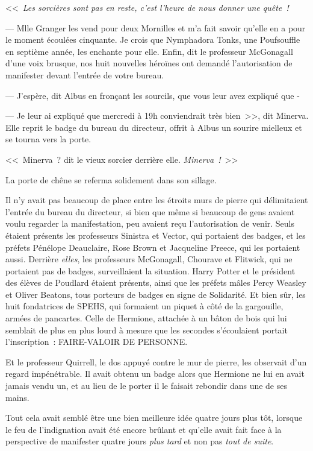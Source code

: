 <<~\emph{Les sorcières sont pas en reste, c'est l'heure de nous donner une quête~!}

--- Mlle Granger les vend pour deux Mornilles et m'a fait savoir qu'elle en a pour le moment écoulées cinquante. Je crois que Nymphadora Tonks, une Poufsouffle en septième année, les enchante pour elle. Enfin, dit le professeur McGonagall d'une voix brusque, nos huit nouvelles héroïnes ont demandé l'autorisation de manifester devant l'entrée de votre bureau.

--- J'espère, dit Albus en fronçant les sourcils, que vous leur avez expliqué que -

--- Je leur ai expliqué que mercredi à 19h conviendrait très bien~>>, dit Minerva. Elle reprit le badge du bureau du directeur, offrit à Albus un sourire mielleux et se tourna vers la porte.

<<~Minerva~? dit le vieux sorcier derrière elle. \emph{Minerva~!}~>>

La porte de chêne se referma solidement dans son sillage.

\later

Il n'y avait pas beaucoup de place entre les étroits murs de pierre qui délimitaient l'entrée du bureau du directeur, si bien que même si beaucoup de gens avaient voulu regarder la manifestation, peu avaient reçu l'autorisation de venir. Seuls étaient présents les professeurs Sinistra et Vector, qui portaient des badges, et les préfets Pénélope Deauclaire, Rose Brown et Jacqueline Preece, qui les portaient aussi. Derrière \emph{elles}, les professeurs McGonagall, Chourave et Flitwick, qui ne portaient pas de badges, surveillaient la situation. Harry Potter et le président des élèves de Poudlard étaient présents, ainsi que les préfets mâles Percy Weasley et Oliver Beatons, tous porteurs de badges en signe de Solidarité. Et bien sûr, les huit fondatrices de SPEHS, qui formaient un piquet à côté de la gargouille, armées de pancartes. Celle de Hermione, attachée à un bâton de bois qui lui semblait de plus en plus lourd à mesure que les secondes s'écoulaient portait l'inscription~: FAIRE-VALOIR DE PERSONNE.

Et le professeur Quirrell, le dos appuyé contre le mur de pierre, les observait d'un regard impénétrable. Il avait obtenu un badge alors que Hermione ne lui en avait jamais vendu un, et au lieu de le porter il le faisait rebondir dans une de ses mains.

Tout cela avait semblé être une bien meilleure idée quatre jours plus tôt, lorsque le feu de l'indignation avait été encore brûlant et qu'elle avait fait face à la perspective de manifester quatre jours \emph{plus tard} et non pas \emph{tout de suite}.

